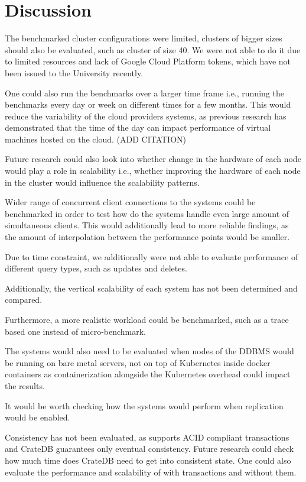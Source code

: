 \section{Discussion}
\label{cha:discussion}

The benchmarked cluster configurations were limited, clusters of bigger sizes should also be evaluated, such as cluster of size 40.
We were not able to do it due to limited resources and lack of Google Cloud Platform tokens, which have not been issued to the University recently.

One could also run the benchmarks over a larger time frame i.e., running the benchmarks every day or week on different times for a few months.
This would reduce the variability of the cloud providers systems, as previous research has demonstrated that the time of the day can impact performance of virtual machines hosted on the cloud. (ADD CITATION)

Future research could also look into whether change in the hardware of each node would play a role in scalability i.e., whether improving the hardware of each node in the cluster would influence the scalability patterns.

Wider range of concurrent client connections to the systems could be benchmarked in order to test how do the systems handle even large amount of simultaneous clients.
This would additionally lead to more reliable findings, as the amount of interpolation between the performance points would be smaller.

Due to time constraint, we additionally were not able to evaluate performance of different query types, such as updates and deletes.

Additionally, the vertical scalability of each system has not been determined and compared.

Furthermore, a more realistic workload could be benchmarked, such as a trace based one instead of micro-benchmark.

The systems would also need to be evaluated when nodes of the DDBMS would be running on bare metal servers, not on top of Kubernetes inside docker containers as containerization alongside the Kubernetes overhead could impact the results.

It would be worth checking how the systems would perform when replication would be enabled.

Consistency has not been evaluated, as \mobilitydbc supports ACID compliant transactions and CrateDB guarantees only eventual consistency.
Future research could check how much time does CrateDB need to get into consistent state.
One could also evaluate the performance and scalability of \mobilitydbc with transactions and without them.

